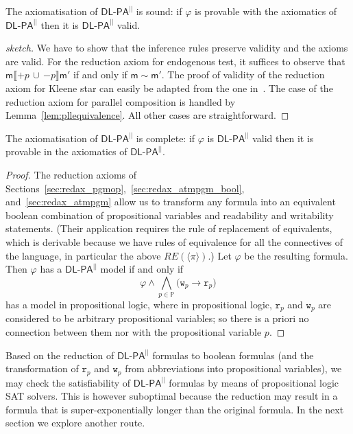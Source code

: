 \documentclass{llncs}
\newcommand{\modl}{\mathsf m}
\newcommand{\pll}{ {||} }							%
\newcommand{\readable}[1]{\mathtt{r}_{#1}}
\newcommand{\writable}[1]{\mathtt{w}_{#1}}
\newcommand{\DlpaPll}{\ensuremath{\mathsf{DL\text{-}PA}^\pll}\xspace}
\newcommand{\assgntopV}[1]{{\mathtt {+} #1}}
\newcommand{\assgnbotV}[1]{{\mathtt {-} #1}}
\newcommand{\intPgm}[1]{\llbracket #1 \rrbracket}
\newcommand{\ldia}[1]{ \big\langle #1 \big\rangle}
\newcommand{\leqv}{ \leftrightarrow }
\newcommand{\limp}{ \rightarrow }
\newcommand{\ndet}{\,{\cup}\,}
\renewcommand{\phi}{\varphi}
\newcommand{\propset}{\mathbb P}
\begin{document}
\begin{theorem}\label{theo:axiomatisationsound}
The axiomatisation of \DlpaPll is sound:
if $\phi$ is provable with the axiomatics of \DlpaPll then it is \DlpaPll valid.
\end{theorem}
\begin{proof}[sketch]
We have to show that the inference rules preserve validity and the axioms are valid. 
For the reduction axiom for endogenous test, it suffices to observe that
$\modl \intPgm{\assgntopV p \ndet \assgnbotV p} \modl'$ if and only if $\modl \sim \modl'$.
The proof of validity of the reduction axiom for Kleene star can easily be adapted from the one in~\cite{BalbianiHerzigTroquard-Lics13}.
The case of the reduction axiom for parallel composition is handled by Lemma~\ref{lem:pllequivalence}.
All other cases are straightforward.
\end{proof}

\begin{theorem}
The axiomatisation of \DlpaPll is complete:
if $\phi$ is \DlpaPll valid then it is provable in the axiomatics of \DlpaPll. 
\end{theorem}
\begin{proof}
The reduction axioms of Sections~\ref{sec:redax_pgmop},~\ref{sec:redax_atmpgm_bool}, and~\ref{sec:redax_atmpgm} 
allow us to transform any formula into an equivalent boolean combination of 
propositional variables and readability and writability statements. 
(Their application requires the rule of replacement of equivalents, which is derivable 
because we have rules of equivalence for all the connectives of the language, 
in particular the above $RE(\ldia \pi)$.)
Let $\phi$ be the resulting formula. 
Then $\phi$ has a \DlpaPll model if and only if 
$$\phi \land 
\bigwedge_{p \in \propset} \big( \writable{p} \limp \readable p \big) $$
has a model in propositional logic, where in propositional logic,
$\readable p$ and $\writable{p}$ are considered to be arbitrary propositional variables; so
there is a priori no connection between them nor with the propositional variable $p$. 
\end{proof}


Based on the reduction of \DlpaPll formulas to boolean formulas 
(and the transformation of $\readable p$ and $\writable{p}$ from abbreviations into propositional variables),
we may check the satisfiability of \DlpaPll formulas by means of propositional logic SAT solvers. 
This is however suboptimal because the reduction may result in a formula that is super-exponentially longer than the original formula. 
In the next section we explore another route.
\end{document}
